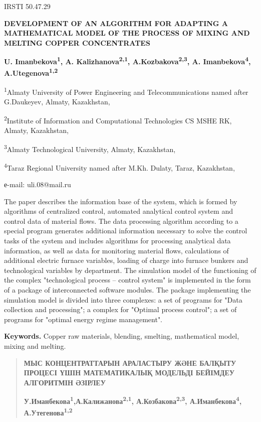 IRSTI 50.47.29

\textbf{DEVELOPMENT OF AN ALGORITHM FOR ADAPTING A MATHEMATICAL MODEL OF
THE PROCESS OF MIXING AND MELTING COPPER CONCENTRATES}

\textbf{U. Imanbekova\textsuperscript{1}, A.
Kalizhanova\textsuperscript{2,1}, A.Kozbakova\textsuperscript{2,3}, A.
Imanbekova\textsuperscript{4}, A.Utegenova\textsuperscript{1,2}}

\textsuperscript{1}Almaty University of Power Engineering and
Telecommunications named after G.Daukeyev, Almaty, Kazakhstan,

\textsuperscript{2}Institute of Information and Computational
Technologies CS MSHE RK, Almaty, Kazakhstan,

\textsuperscript{3}Almaty Technological University, Almaty, Kazakhstan,

\textsuperscript{4}Taraz Regional University named after M.Kh. Dulaty,
Taraz, Kazakhstan,

е-mail: uli.08@mail.ru

The paper describes the information base of the system, which is formed
by algorithms of centralized control, automated analytical control
system and control data of material flows. The data processing algorithm
according to a special program generates additional information
necessary to solve the control tasks of the system and includes
algorithms for processing analytical data information, as well as data
for monitoring material flows, calculations of additional electric
furnace variables, loading of charge into furnace bunkers and
technological variables by department. The simulation model of the
functioning of the complex "technological process -- control system" is
implemented in the form of a package of interconnected software modules.
The package implementing the simulation model is divided into three
complexes: a set of programs for "Data collection and processing"; a
complex for "Optimal process control"; a set of programs for "optimal
energy regime management".

\textbf{Keywords.} Copper raw materials, blending, smelting,
mathematical model, mixing and melting.

\begin{quote}
\textbf{МЫС КОНЦЕНТРАТТАРЫН АРАЛАСТЫРУ ЖӘНЕ БАЛҚЫТУ ПРОЦЕСІ ҮШІН
МАТЕМАТИКАЛЫҚ МОДЕЛЬДІ БЕЙІМДЕУ АЛГОРИТМІН ӘЗІРЛЕУ}

\textbf{У.Иманбекова\textsuperscript{1},А.Калижанова\textsuperscript{2,1},
А.Козбакова\textsuperscript{2,3}, А.Иманбекова\textsuperscript{4},
А.Утегенова\textsuperscript{1,2}}
\end{quote}

